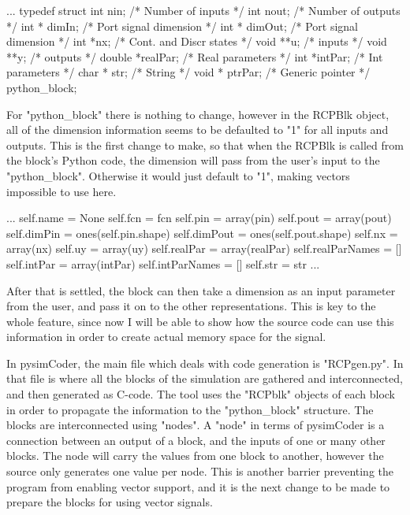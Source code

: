 \begtt
...
typedef struct {
  int nin;             /* Number of inputs */
  int nout;            /* Number of outputs */
  int * dimIn;       /* Port signal dimension */
  int * dimOut;      /* Port signal dimension */
  int *nx;             /* Cont. and Discr states */
  void **u;            /* inputs */
  void **y;            /* outputs */
  double *realPar;     /* Real parameters */
  int *intPar;         /* Int parameters */
  char * str;          /* String */
  void * ptrPar;       /* Generic pointer */
}python_block;
\endtt

\quad For "python_block" there is nothing to change,
however in the RCPBlk object, all of the dimension information seems to be defaulted to "1" for all inputs
and outputs. This is the first change to make, so that when the RCPBlk is called from the block's Python
code, the dimension will pass from the user's input to the "python_block". Otherwise it would just default to
"1", making vectors impossible to use here.

\begtt
...
        self.name = None
        self.fcn = fcn
        self.pin = array(pin)
        self.pout = array(pout)
        self.dimPin = ones(self.pin.shape)
        self.dimPout = ones(self.pout.shape)
        self.nx = array(nx)
        self.uy = array(uy)
        self.realPar = array(realPar)
        self.realParNames = []
        self.intPar = array(intPar)
        self.intParNames = []
        self.str = str
...
\endtt

\quad After that is settled, the block can then take a dimension as an input parameter from the user, and pass
it on to the other representations. This is key to the whole feature, since now I will be able to show how
the source code can use this information in order to create actual memory space for the signal.

\quad In pysimCoder, the main file which deals with code generation is "RCPgen.py". In that file is where all
the blocks of the simulation are gathered and interconnected, and then generated as C-code. The tool uses the
"RCPblk" objects of each block in order to propagate the information to the "python_block" structure. The
blocks are interconnected using "nodes". A "node" in terms of pysimCoder is a connection between an output of
a block, and the inputs of one or many other blocks. The node will carry the values from one block to another,
however the source only generates one value per node. This is another barrier preventing the program from
enabling vector support, and it is the next change to be made to prepare the blocks for using vector signals.

